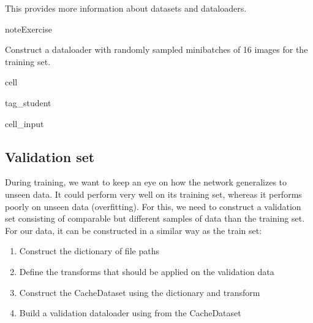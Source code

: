 \documentclass[letterpaper,10pt,english]{jupyterBook}
\begin{document}
\sphinxAtStartPar
This  provides more information about datasets and dataloaders.

\begin{sphinxadmonition}{note}{Exercise}

\sphinxAtStartPar
Construct a dataloader with randomly sampled mini\sphinxhyphen{}batches of 16 images for the training set.
\end{sphinxadmonition}

\begin{sphinxuseclass}{cell}
\begin{sphinxuseclass}{tag_student}\begin{sphinxVerbatimInput}

\begin{sphinxuseclass}{cell_input}
\begin{sphinxVerbatim}[commandchars=\\\{\}]
\end{sphinxVerbatim}

\end{sphinxuseclass}\end{sphinxVerbatimInput}

\end{sphinxuseclass}
\end{sphinxuseclass}

\subsection{Validation set}
\label{\detokenize{notebooks/Tutorial3_Segmentation/Tutorial3_Segmentation_student:validation-set}}
\sphinxAtStartPar
During training, we want to keep an eye on how the network generalizes to unseen data. It could perform very well on its training set, whereas it performs poorly on unseen data (overfitting). For this, we need to construct a validation set consisting of comparable but different samples of data than the training set. For our data, it can be constructed in a similar way as the train set:
\begin{enumerate}
%
\item {} 
\sphinxAtStartPar
Construct the dictionary of file paths

\item {} 
\sphinxAtStartPar
Define the transforms that should be applied on the validation data

\item {} 
\sphinxAtStartPar
Construct the CacheDataset using the dictionary and transform

\item {} 
\sphinxAtStartPar
Build a validation dataloader using from the CacheDataset

\end{enumerate}
\end{document}

